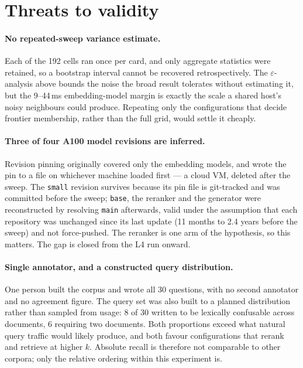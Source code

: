 \section{Threats to validity}
\label{sec:threats}

\paragraph{No repeated-sweep variance estimate.} Each of the 192 cells ran once
per card, and only aggregate statistics were retained, so a bootstrap interval
cannot be recovered retrospectively. The $\varepsilon$-analysis above bounds the
noise the broad result tolerates without estimating it, but the 9--44\,ms
embedding-model margin is exactly the scale a shared host's noisy neighbours
could produce. Repeating only the configurations that decide frontier
membership, rather than the full grid, would settle it cheaply.

\paragraph{Three of four A100 model revisions are inferred.} Revision pinning
originally covered only the embedding models, and wrote the pin to a file on
whichever machine loaded first --- a cloud VM, deleted after the sweep. The
\texttt{small} revision survives because its pin file is git-tracked and was
committed before the sweep; \texttt{base}, the reranker and the generator were
reconstructed by resolving \texttt{main} afterwards, valid under the assumption
that each repository was unchanged since its last update (11 months to 2.4 years
before the sweep) and not force-pushed. The reranker is one arm of the
hypothesis, so this matters. The gap is closed from the L4 run onward.

\paragraph{Single annotator, and a constructed query distribution.} One person
built the corpus and wrote all 30 questions, with no second annotator and no
agreement figure. The query set was also built to a planned distribution rather
than sampled from usage: 8 of 30 written to be lexically confusable across
documents, 6 requiring two documents. Both proportions exceed what natural query
traffic would likely produce, and both favour configurations that rerank and
retrieve at higher $k$. Absolute recall is therefore not comparable to other
corpora; only the relative ordering within this experiment is.

